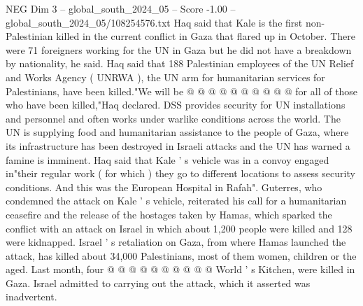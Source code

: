 \begin{textsample}{NEG Dim 3 – global\_south\_2024\_05 – Score -1.00 – global\_south\_2024\_05/108254576.txt}
Haq said that Kale is the first non-Palestinian killed in the current conflict in Gaza that flared up in October.
There were 71 foreigners working for the UN in Gaza but he did not have a breakdown by nationality, he said.
Haq said that 188 Palestinian employees of the UN Relief and Works Agency ( UNRWA ), the UN arm for humanitarian services for Palestinians, have been killed."We will be @ @ @ @ @ @ @ @ @ @ for all of those who have been killed,"Haq declared.
DSS provides security for UN installations and personnel and often works under warlike conditions across the world.
The UN is supplying food and humanitarian assistance to the people of Gaza, where its infrastructure has been destroyed in Israeli attacks and the UN has warned a famine is imminent.
Haq said that Kale ' s vehicle was in a convoy engaged in"their regular work ( for which ) they go to different locations to assess security conditions.
And this was the European Hospital in Rafah".
Guterres, who condemned the attack on Kale ' s vehicle, reiterated his call for a humanitarian ceasefire and the release of the hostages taken by Hamas, which sparked the conflict with an attack on Israel in which about 1,200 people were killed and 128 were kidnapped.
Israel ' s retaliation on Gaza, from where Hamas launched the attack, has killed about 34,000 Palestinians, most of them women, children or the aged.
Last month, four @ @ @ @ @ @ @ @ @ @ World ' s Kitchen, were killed in Gaza.
Israel admitted to carrying out the attack, which it asserted was inadvertent.

\end{textsample}
